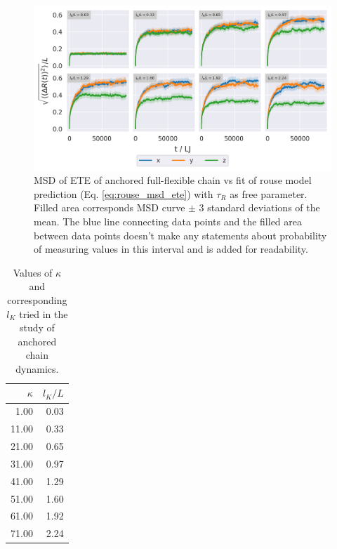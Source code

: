 \documentclass[
    paper=A4,pagesize=automedia,fontsize=12pt,
    BCOR=15mm,DIV=22,
    twoside,headinclude,footinclude=false,
    ngerman,fleqn,             %
    bibliography=totocnumbered,          %
    listof=totoc,                %
    listof=flat,                 %
    cleardoublepage=empty      %
    numbers=endperiod
]{scrartcl}
\begin{document}
\begin{figure}[h]
    \begin{center}
      \includegraphics[width=\columnwidth,trim={0cm 0cm 0cm 0.0cm},clip]{4-exp-msd_by_dim.png}
      \caption{\label{fig:msd_anchored_l_K_by_dim}
      MSD of ETE of anchored full-flexible chain vs fit of rouse model prediction 
      (Eq. \ref{eq:rouse_msd_ete}) with $\tau_R$ as free parameter.
      Filled area corresponds MSD curve $\pm$ 3 standard deviations of the mean. The
      blue line connecting data points and the filled area between data points doesn't make
      any statements about probability of measuring values in this interval and is
      added for readability.
      }
    \end{center}
\end{figure}

\begin{table}[h]
    
    \centering
\begin{tabular}{rr}
    \toprule
    $\kappa$ & $l_K / L$ \\
    \midrule
    1.00 & 0.03 \\
    11.00 & 0.33 \\
    21.00 & 0.65 \\
    31.00 & 0.97 \\
    41.00 & 1.29 \\
    51.00 & 1.60 \\
    61.00 & 1.92 \\
    71.00 & 2.24 \\
    \bottomrule
    \end{tabular}
    \caption{
        Values of $\kappa$ and corresponding $l_K$ tried in the study
        of anchored chain dynamics.
        }
    \label{table:kappa_values}
\end{table}
\end{document}
